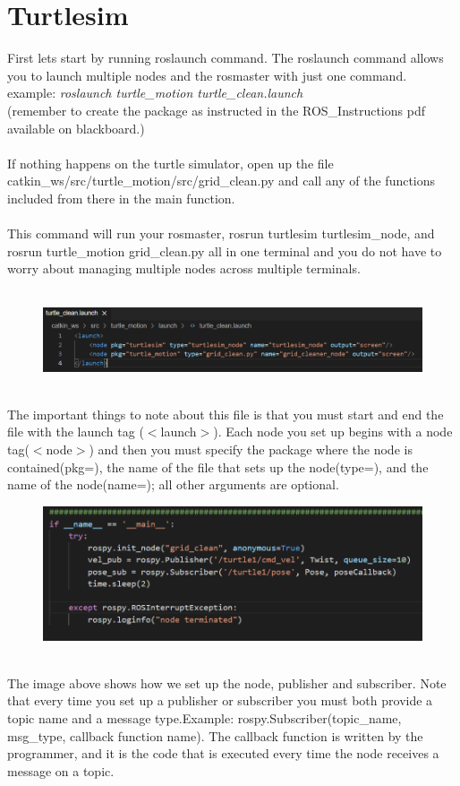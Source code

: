 \documentclass{article}
\begin{document}
\section{Turtlesim}
First lets start by running roslaunch command. The roslaunch command allows you to launch multiple nodes and the rosmaster with just one command.\\
example: \emph{roslaunch turtle\_motion turtle\_clean.launch} \\(remember to create the package as instructed in the ROS\_Instructions pdf available on blackboard.)\\\\
If nothing happens on the turtle simulator, open up the file catkin\_ws/src/turtle\_motion/src/grid\_clean.py and call any of the functions included from there in the main function.\\\\
This command will run your rosmaster, rosrun turtlesim turtlesim\_node, and rosrun turtle\_motion grid\_clean.py all in one terminal and you do not have to worry about managing multiple nodes across multiple terminals.\\\\
\begin{figure}[htp]
    \includegraphics[width=12cm]{launchfile.png}
    \label{fig:launch}
\end{figure} \\
The important things to note about this file is that you must start and end the file with the launch tag ($<$launch$>$).  Each node you set up begins with a node tag($<$node$>$) and then you must specify the package where the node is contained(pkg=), the name of the file that sets up the node(type=), and the name of the node(name=); all other arguments are optional.
\newpage

\begin{figure}[htp]
    \includegraphics[width=12cm]{main.png}
    \label{fig:mainy}
\end{figure} \\
The image above shows how we set up the node, publisher and subscriber. Note that every time you set up a publisher or subscriber you must both provide a topic name and a message type.Example: rospy.Subscriber(topic\_name, msg\_type, callback function name). The callback function is written by the programmer, and it is the code that is executed every time the node receives a message on a topic.\\\\
\end{document}
